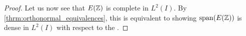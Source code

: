 \documentclass[../thesis.tex]{subfiles}
\begin{document}
\begin{proof}
    Let us now see that $E(\mathbb{Z})$ is complete in $L^2(I)$. By \cref{thrm:orthonormal_equivalences}, this is equivalent to showing $\operatorname{span}(E(\mathbb{Z}))$ is dense in $L^2(I)$ with respect to the \Ltwonorm. 


\end{proof}
\end{document}
